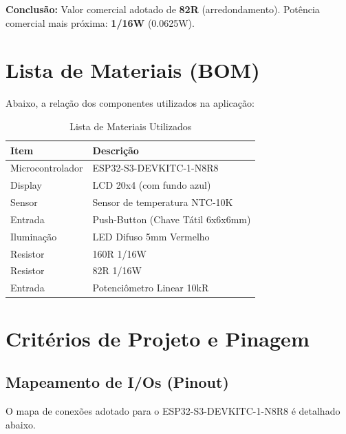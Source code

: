 \documentclass[12pt,a4paper]{article}
\begin{document}
	\textbf{Conclusão:} Valor comercial adotado de \textbf{82R} (arredondamento).
	Potência comercial mais próxima: \textbf{1/16W} (0.0625W).
	
	\section{Lista de Materiais (BOM)}
	
	Abaixo, a relação dos componentes utilizados na aplicação:
	
	\begin{table}[H]
		\centering
		\begin{tabular}{ll}
			\toprule
			\textbf{Item} & \textbf{Descrição} \\ \midrule
			Microcontrolador & ESP32-S3-DEVKITC-1-N8R8 \\
			Display & LCD 20x4 (com fundo azul) \\
			Sensor & Sensor de temperatura NTC-10K \\
			Entrada & Push-Button (Chave Tátil 6x6x6mm) \\
			Iluminação & LED Difuso 5mm Vermelho \\
			Resistor & 160R 1/16W \\
			Resistor & 82R 1/16W \\
			Entrada & Potenciômetro Linear 10kR \\ \bottomrule
		\end{tabular}
		\caption{Lista de Materiais Utilizados}
	\end{table}
	
	\section{Critérios de Projeto e Pinagem}
	
	\subsection{Mapeamento de I/Os (Pinout)}
	O mapa de conexões adotado para o ESP32-S3-DEVKITC-1-N8R8 é detalhado abaixo.
	
\end{document}
